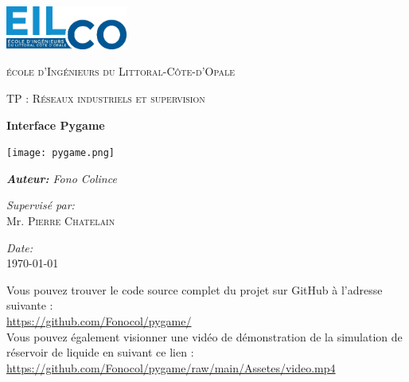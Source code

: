 \documentclass{article}
\begin{document}
\begin{titlepage}
    \centering
    \includegraphics[width=0.3\textwidth]{EILCO-LOGO-2022.png}\par\vspace{1cm}
    {\scshape\LARGE école d'Ingénieurs du Littoral-Côte-d'Opale\par}
    \vspace{1cm}
    {\scshape\Large TP : Réseaux industriels et supervision \par} 
    \vspace{1.5cm}
    {\huge\bfseries Interface Pygame\par}
    \vspace{0.5cm}
    \texttt{[image: pygame.png]}\par
    \vspace{1.5cm}
    {\Large\itshape\textbf{Auteur:} Fono Colince\par}
    \vfill
    \begin{minipage}{0.4\textwidth}
        \begin{flushleft} \large
            \emph{Supervisé par:}\\
            Mr. \textsc{Pierre Chatelain} \\
        \end{flushleft}
    \end{minipage}
    \begin{minipage}{0.4\textwidth}
        \begin{flushright} \large
            \emph{Date:} \\
            \today
        \end{flushright}
    \end{minipage}
    \vfill
    \vspace{0.5cm}
    \begin{center}
        Vous pouvez trouver le code source complet du projet sur GitHub à l'adresse suivante : \\
        \url{https://github.com/Fonocol/pygame/}\\
        Vous pouvez également visionner une vidéo de démonstration de la simulation de réservoir de liquide en suivant ce lien : \\
        \url{https://github.com/Fonocol/pygame/raw/main/Assetes/video.mp4}
    \end{center}
\end{titlepage}
\end{document}
